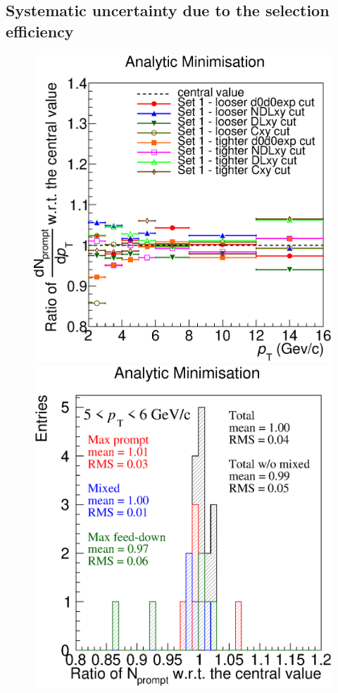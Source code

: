 \documentclass[b5paper,10pt,twoside,oldstyle,classica]{toptesi}
\begin{document}
\subsection{Systematic uncertainty due to the selection efficiency}
\begin{figure}[tb]
\begin{center}
{\includegraphics[scale = 0.32]{CutVarSet1_Prompt_Min_syst_cutsets_ratioonly.eps}}
\hspace{-0.5cm}
{\includegraphics[scale = 0.32]{DispPromptMin3.eps}}

\end{center}
\end{figure}
\end{document}

